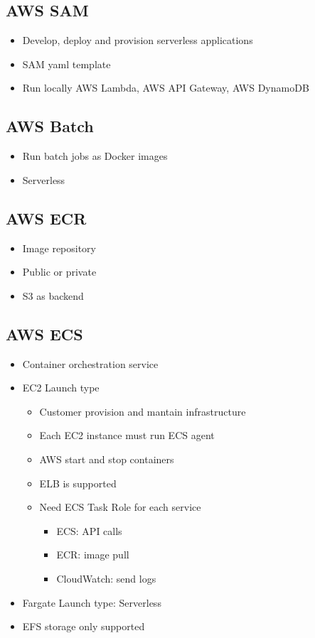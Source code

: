 \documentclass[../../main.tex]{subfiles}
\begin{document}
\subsection{AWS SAM}
\begin{itemize}
    \item Develop, deploy and provision serverless applications
    \item SAM yaml template
    \item Run locally AWS Lambda, AWS API Gateway, AWS DynamoDB
\end{itemize}

\subsection{AWS Batch}
\begin{itemize}
    \item Run batch jobs as Docker images
    \item Serverless
\end{itemize}


\subsection{AWS ECR}
\begin{itemize}
    \item Image repository
    \item Public or private
    \item S3 as backend
\end{itemize}


\subsection{AWS ECS}
\begin{itemize}
    \item Container orchestration service
    \item EC2 Launch type
    \begin{itemize}
        \item Customer provision and mantain infrastructure
        \item Each EC2 instance must run ECS agent
        \item AWS start and stop containers
        \item ELB is supported
        \item Need ECS Task Role for each service
        \begin{itemize}
            \item ECS: API calls
            \item ECR: image pull
            \item CloudWatch: send logs
        \end{itemize}
    \end{itemize}
    \item Fargate Launch type: Serverless
    \item EFS storage only supported
\end{itemize}
\end{document}
